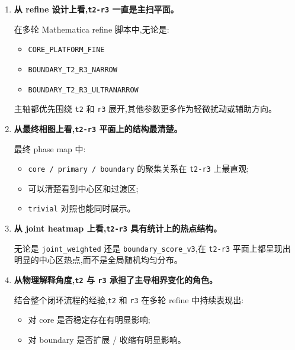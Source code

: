 \documentclass[lang=cn,scheme=chinese,color=blue,device=normal,toc=onecol,math=cm]{elegantbook}
\begin{document}
\begin{enumerate}
\item \textbf{从 refine 设计上看,\texttt{t2-r3} 一直是主扫平面。}\par
 
在多轮 Mathematica refine 脚本中,无论是:\par
 
\begin{itemize}
\item \texttt{CORE\_\allowbreak{}PLATFORM\_\allowbreak{}FINE}
\item \texttt{BOUNDARY\_\allowbreak{}T2\_\allowbreak{}R3\_\allowbreak{}NARROW}
\item \texttt{BOUNDARY\_\allowbreak{}T2\_\allowbreak{}R3\_\allowbreak{}ULTRANARROW}
\end{itemize}
 
主轴都优先围绕 \texttt{t2} 和 \texttt{r3} 展开,其他参数更多作为轻微扰动或辅助方向。\par
\item \textbf{从最终相图上看,\texttt{t2-r3} 平面上的结构最清楚。}\par
 
最终 phase map 中:\par
 
\begin{itemize}
\item \texttt{core /\allowbreak{} primary /\allowbreak{} boundary} 的聚集关系在 \texttt{t2-r3} 上最直观;
\item 可以清楚看到中心区和过渡区;
\item \texttt{trivial} 对照也能同时展示。
\end{itemize}
\item \textbf{从 joint heatmap 上看,\texttt{t2-r3} 具有统计上的热点结构。}\par
 
无论是 \texttt{joint\_\allowbreak{}weighted} 还是 \texttt{boundary\_\allowbreak{}score\_\allowbreak{}v3},在 \texttt{t2-r3} 平面上都呈现出明显的中心区热点,而不是全局随机均匀分布。\par
\item \textbf{从物理解释角度,\texttt{t2} 与 \texttt{r3} 承担了主导相界变化的角色。}\par
 
结合整个闭环流程的经验,\texttt{t2} 和 \texttt{r3} 在多轮 refine 中持续表现出:\par
 
\begin{itemize}
\item 对 core 是否稳定存在有明显影响;
\item 对 boundary 是否扩展 /\allowbreak{} 收缩有明显影响。
\end{itemize}
 

\end{enumerate}
\end{document}
